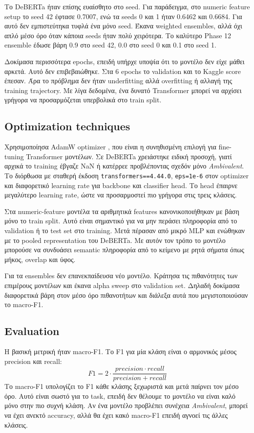 \documentclass[12pt]{fphw}
\begin{document}
Το DeBERTa ήταν επίσης ευαίσθητο στο seed. Για παράδειγμα, στο numeric feature setup το seed 42 έφτασε 0.7007, ενώ τα seeds 0 και 1 ήταν 0.6462 και 0.6684. Για αυτό δεν εμπιστεύτηκα τυφλά ένα μόνο seed. Έκανα weighted ensembles, αλλά όχι απλό μέσο όρο όταν κάποια seeds ήταν πολύ χειρότερα. Το καλύτερο Phase 12 ensemble έδωσε βάρη 0.9 στο seed 42, 0.0 στο seed 0 και 0.1 στο seed 1.

Δοκίμασα περισσότερα epochs, επειδή υπήρχε υποψία ότι το μοντέλο δεν είχε μάθει αρκετά. Αυτό δεν επιβεβαιώθηκε. Στα 6 epochs το validation και το Kaggle score έπεσαν. Άρα το πρόβλημα δεν ήταν underfitting αλλά overfitting ή αλλαγή της training trajectory. Με λίγα δεδομένα, ένα δυνατό Transformer μπορεί να αρχίσει γρήγορα να προσαρμόζεται υπερβολικά στο train split.

\subsection{Optimization techniques}

Χρησιμοποίησα AdamW optimizer \cite{loshchilov2019adamw}, που είναι η συνηθισμένη επιλογή για fine-tuning Transformer μοντέλων. Σε DeBERTa χρειάστηκε ειδική προσοχή, γιατί αρχικά το training έβγαζε NaN ή κατέρρεε προβλέποντας σχεδόν μόνο \emph{Ambivalent}. Το διόρθωσα με σταθερή έκδοση \texttt{transformers==4.44.0}, \texttt{eps=1e-6} στον optimizer και διαφορετικό learning rate για backbone και classifier head. Το head έπαιρνε μεγαλύτερο learning rate, ώστε να προσαρμοστεί πιο γρήγορα στις τρεις κλάσεις.

Στα numeric-feature μοντέλα τα αριθμητικά features κανονικοποιήθηκαν με βάση μόνο το train split. Αυτό είναι σημαντικό για να μην περάσει πληροφορία από το validation ή το test set στο training. Μετά πέρασαν από μικρό MLP και ενώθηκαν με το pooled representation του DeBERTa. Με αυτόν τον τρόπο το μοντέλο μπορούσε να συνδυάσει semantic πληροφορία από το κείμενο με ρητά σήματα όπως μήκος, overlap και ύφος.

Για τα ensembles δεν επανεκπαίδευσα νέο μοντέλο. Κράτησα τις πιθανότητες των επιμέρους μοντέλων και έκανα alpha sweep στο validation set. Δηλαδή δοκίμασα διαφορετικά βάρη στον μέσο όρο πιθανοτήτων και διάλεξα αυτά που μεγιστοποιούσαν το macro-F1.

\subsection{Evaluation}

Η βασική μετρική ήταν macro-F1. Το F1 για μία κλάση είναι ο αρμονικός μέσος precision και recall:
\[
F1 = 2 \cdot \frac{precision \cdot recall}{precision + recall}
\]
Το macro-F1 υπολογίζει το F1 κάθε κλάσης ξεχωριστά και μετά παίρνει τον μέσο όρο. Αυτό είναι σωστό για το task, επειδή δεν θέλουμε το μοντέλο να είναι καλό μόνο στην πιο συχνή κλάση. Αν ένα μοντέλο προβλέπει συνέχεια \emph{Ambivalent}, μπορεί να έχει ανεκτό accuracy, αλλά θα έχει κακό macro-F1 επειδή αγνοεί τις άλλες κλάσεις.
\end{document}
